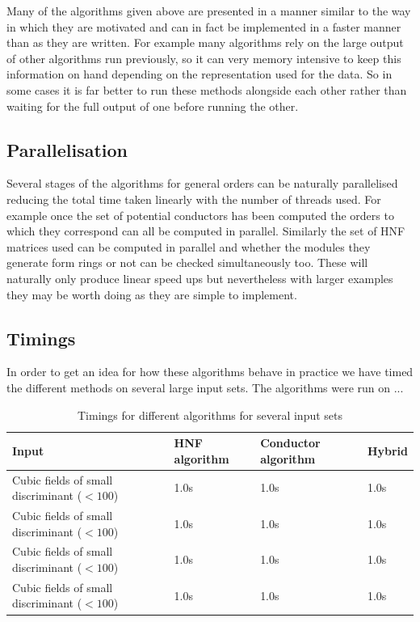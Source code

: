 \documentclass[12pt,a4paper,abstracton,bibtotoc]{scrreprt}
\theoremstyle{definition}
\begin{document}
Many of the algorithms given above are presented in a manner similar to the way in which they are motivated and can in fact be implemented in a faster manner than as they are written.
For example many algorithms rely on the large output of other algorithms run previously, so it can very memory intensive to keep this information on hand depending on the representation used for the data.
So in some cases it is far better to run these methods alongside each other rather than waiting for the full output of one before running the other.

\subsection{Parallelisation}
Several stages of the algorithms for general orders can be naturally parallelised reducing the total time taken linearly with the number of threads used.
For example once the set of potential conductors has been computed the orders to which they correspond can all be computed in parallel.
Similarly the set of HNF matrices used can be computed in parallel and whether the modules they generate form rings or not can be checked simultaneously too.
These will naturally only produce linear speed ups but nevertheless with larger examples they may be worth doing as they are simple to implement.

\subsection{Timings}
In order to get an idea for how these algorithms behave in practice we have timed the different methods on several large input sets.
The algorithms were run on ...
\begin{table}[h]
\begin{tabular}{|p{14em}|l|l|l|}
\hline
Input & HNF algorithm & Conductor algorithm & Hybrid \\
\hline
Cubic fields of small discriminant ($< 100$) & 1.0s & 1.0s & 1.0s \\
Cubic fields of small discriminant ($< 100$) & 1.0s & 1.0s & 1.0s \\
Cubic fields of small discriminant ($< 100$) & 1.0s & 1.0s & 1.0s \\
Cubic fields of small discriminant ($< 100$) & 1.0s & 1.0s & 1.0s \\
\hline
\end{tabular}
\caption{\label{tab:timings} Timings for different algorithms for several input sets}
\end{table}
\end{document}
